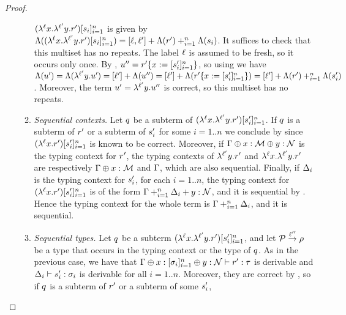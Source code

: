\begin{proof}
\begin{enumerate}
\begin{enumerate}
    $(\lambda^{\ell} x. \lambda^{\ell'} y. r')[s_i]_{i=1}^{n}$
    is given by
    $\Lambda((\lambda^{\ell} x. \lambda^{\ell'} y. r')[s_i]_{i=1}^{n})
     = [\ell,\ell'] + \Lambda(r') +_{i=1}^{n} \Lambda(s_i)$.
    It suffices to check that this multiset has no repeats.
    The label $\ell$ is assumed to be fresh, so it occurs only once.
    By \ih, $u'' = r'\{x := [s'_i]_{i=1}^{n}\}$,
    so using  we have
    $\Lambda(u') =
     \Lambda(\lambda^{\ell'} y. u') =
     [\ell'] + \Lambda(u'') =
     [\ell'] + \Lambda(r'\{x := [s'_i]_{i=1}^{n}\}) =
     [\ell'] + \Lambda(r') +_{i=1}^n \Lambda(s'_i)$.
    Moreover, the term $u' = \lambda^{\ell'} y. u''$ is correct,
    so this multiset has no repeats.
  \item {\em Sequential contexts.}
    Let $q$ be a subterm of $(\lambda^{\ell} x. \lambda^{\ell'} y. r')[s'_i]_{i=1}^{n}$.
    If $q$ is a subterm of $r'$ or a subterm of $s'_i$ for some $i=1..n$ we conclude by \ih
    since $(\lambda^{\ell} x. r')[s'_i]_{i=1}^{n}$ is known to be correct.
    Moreover, if $\Gamma \oplus x : \mathcal{M} \oplus y : \mathcal{N}$ is the typing context for $r'$,
    the typing contexts of
    $\lambda^{\ell'} y. r'$ and $\lambda^{\ell} x. \lambda^{\ell'} y. r'$
    are respectively $\Gamma \oplus x : \mathcal{M}$ and $\Gamma$, which are also sequential.
    Finally, if $\Delta_i$ is the typing context for $s'_i$, for each $i=1..n$,
    the typing context for $(\lambda^{\ell} x. r')[s'_i]_{i=1}^{n}$ 
    is of the form $\Gamma +_{i=1}^n \Delta_i + y : \mathcal{N}$, and it is sequential by \ih.
    Hence the typing context for the whole term is $\Gamma +_{i=1}^n \Delta_i$, and it is sequential.
  \item {\em Sequential types.}
    \label{refinement_substitution_inverse__case_lambda_sequential_types}
    Let $q$ be a subterm $(\lambda^{\ell} x. \lambda^{\ell'} y. r')[s'_i]_{i=1}^{n}$,
    and let $\mathcal{P} \overset{\ell''}{\to} \rho$ be a type that occurs in the typing context
    or the type of $q$.
    As in the previous case, we have that
    $\Gamma \oplus x : [\sigma_i]_{i=1}^n \oplus y : \mathcal{N} \vdash r' : \tau$ is derivable
    and $\Delta_i \vdash s'_i : \sigma_i$ is derivable for all $i=1..n$.
    Moreover, they are correct by \ih, so if $q$ is a subterm of $r'$ or a subterm of some $s'_i$,

\end{enumerate}
\end{enumerate}
\end{proof}
